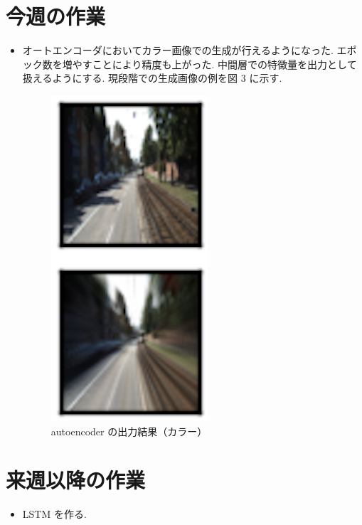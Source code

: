 \section{今週の作業}
\begin{itemize}       
         \item オートエンコーダにおいてカラー画像での生成が行えるようになった. エポック数を増やすことにより精度も上がった. 中間層での特徴量を出力として扱えるようにする. 現段階での生成画像の例を図 3 に示す.
\begin{figure}[hb]
\begin{center}
\includegraphics[scale=1.0]{autoencoder_2.png}
\caption{autoencoder の出力結果（カラー）}
\end{center}
\end{figure}
\end{itemize}

\section{来週以降の作業}
\begin{itemize}
         \item LSTM を作る.
\end{itemize}





